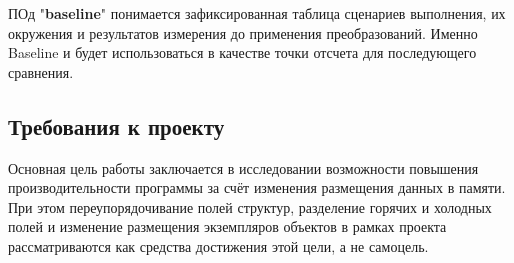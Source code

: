 \documentclass[a4paper,12pt]{article}
\begin{document}
ПОд "\textbf{baseline}" понимается зафиксированная таблица сценариев выполнения,
их окружения и результатов измерения до применения преобразований. Именно
Baseline и будет использоваться в качестве точки отсчета для последующего сравнения.

\subsection{Требования к проекту}
Основная цель работы заключается в исследовании возможности повышения производительности 
программы за счёт изменения размещения данных в памяти. При этом переупорядочивание полей 
структур, разделение горячих и холодных полей и 
изменение  размещения экземпляров объектов в рамках проекта рассматриваются 
как средства достижения этой цели, а не самоцель.
\end{document}
